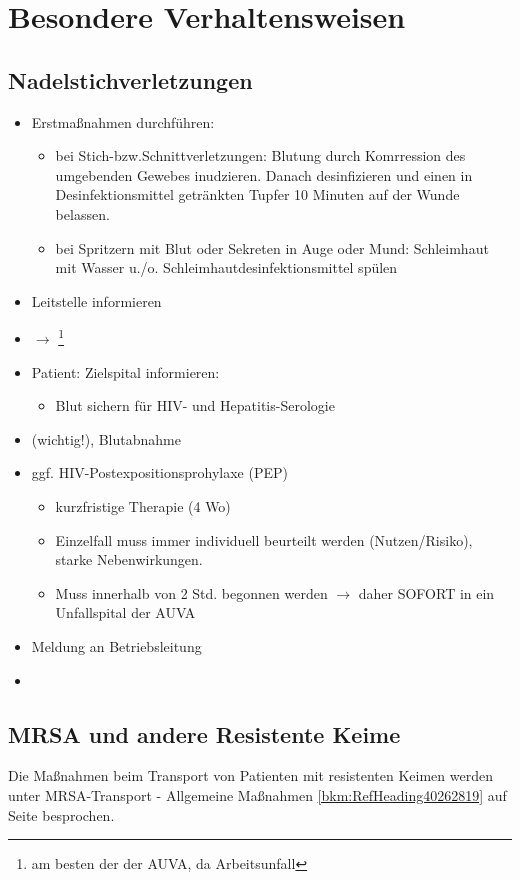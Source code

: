 \section{Besondere Verhaltensweisen}
\subsection{Nadelstichverletzungen}
\begin{itemize}
    \item Erstma{\ss}nahmen durchf\"uhren: \cite{OeAG2007}
    \begin{itemize}
        \item bei Stich-bzw.Schnittverletzungen:
        Blutung durch Komrression des umgebenden
        Gewebes inudzieren. Danach desinfizieren und einen
        in Desinfektionsmittel getränkten Tupfer 10 Minuten
        auf der Wunde belassen.
        \item bei Spritzern mit Blut oder Sekreten in Auge oder Mund:
        Schleimhaut mit Wasser u./o. Schleimhautdesinfektionsmittel sp\"ulen
    \end{itemize}
    \item Leitstelle informieren
    \item ${\rightarrow}$ \footnote{am besten der der AUVA, da Arbeitsunfall}
    \item Patient: Zielspital informieren:
    \begin{itemize}
        \item Blut sichern f\"ur HIV- und Hepatitis-Serologie
    \end{itemize}
    \item  {}  (wichtig!), Blutabnahme
    \item ggf. HIV-Postexpositionsprohylaxe (PEP)
    \begin{itemize}
        \item kurzfristige Therapie (4 Wo)
        \item Einzelfall muss immer individuell beurteilt werden
        (Nutzen/Risiko), starke Nebenwirkungen.
        \item Muss innerhalb von 2 Std. begonnen werden ${\rightarrow}$ daher
        SOFORT in ein Unfallspital der AUVA
    \end{itemize}
    \item Meldung an Betriebsleitung
    \item {}
\end{itemize}



\subsection{MRSA und andere Resistente Keime}

Die Ma{\ss}nahmen beim Transport von Patienten mit resistenten Keimen
werden unter {\quotedblbase}MRSA-Transport - Allgemeine
Ma{\ss}nahmen{\quotedblbase} 
\ref{bkm:RefHeading40262819} auf
Seite \pageref{bkm:RefHeading40262819} besprochen.
